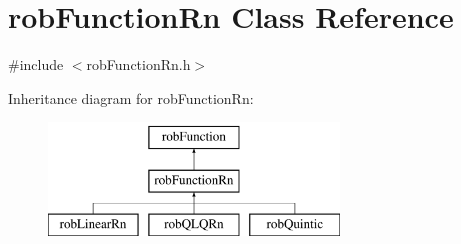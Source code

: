 \hypertarget{classrob_function_rn}{\section{rob\-Function\-Rn Class Reference}
\label{classrob_function_rn}
}


{\ttfamily \#include $<$rob\-Function\-Rn.\-h$>$}

Inheritance diagram for rob\-Function\-Rn\-:\begin{figure}[H]
\begin{center}
\leavevmode
\includegraphics[height=3.000000cm]{df/de7/classrob_function_rn}
\end{center}
\end{figure}
